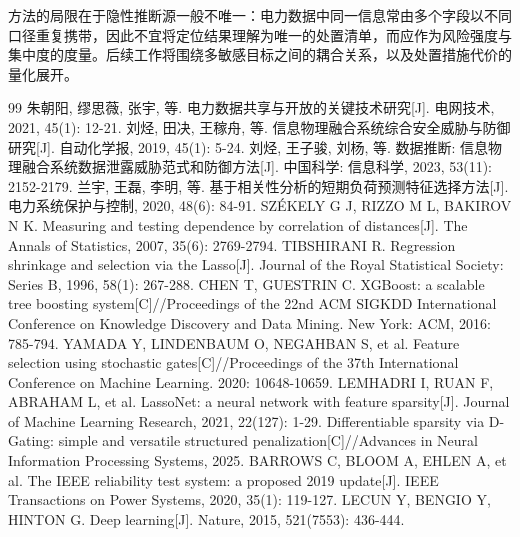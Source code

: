\documentclass[UTF8,zihao=5,twoside]{ctexart}
\begin{document}
方法的局限在于隐性推断源一般不唯一：电力数据中同一信息常由多个字段以不同口径重复携带，因此不宜将定位结果理解为唯一的处置清单，而应作为风险强度与集中度的度量。后续工作将围绕多敏感目标之间的耦合关系，以及处置措施代价的量化展开。

\begin{thebibliography}{99}
朱朝阳, 缪思薇, 张宇, 等. 电力数据共享与开放的关键技术研究[J]. 电网技术, 2021, 45(1): 12-21.
刘烃, 田决, 王稼舟, 等. 信息物理融合系统综合安全威胁与防御研究[J]. 自动化学报, 2019, 45(1): 5-24.
刘烃, 王子骏, 刘杨, 等. 数据推断: 信息物理融合系统数据泄露威胁范式和防御方法[J]. 中国科学: 信息科学, 2023, 53(11): 2152-2179.
兰宇, 王磊, 李明, 等. 基于相关性分析的短期负荷预测特征选择方法[J]. 电力系统保护与控制, 2020, 48(6): 84-91.
SZ\'{E}KELY G J, RIZZO M L, BAKIROV N K. Measuring and testing dependence by correlation of distances[J]. The Annals of Statistics, 2007, 35(6): 2769-2794.
TIBSHIRANI R. Regression shrinkage and selection via the Lasso[J]. Journal of the Royal Statistical Society: Series B, 1996, 58(1): 267-288.
CHEN T, GUESTRIN C. XGBoost: a scalable tree boosting system[C]//Proceedings of the 22nd ACM SIGKDD International Conference on Knowledge Discovery and Data Mining. New York: ACM, 2016: 785-794.
YAMADA Y, LINDENBAUM O, NEGAHBAN S, et al. Feature selection using stochastic gates[C]//Proceedings of the 37th International Conference on Machine Learning. 2020: 10648-10659.
LEMHADRI I, RUAN F, ABRAHAM L, et al. LassoNet: a neural network with feature sparsity[J]. Journal of Machine Learning Research, 2021, 22(127): 1-29.
Differentiable sparsity via D-Gating: simple and versatile structured penalization[C]//Advances in Neural Information Processing Systems, 2025.
BARROWS C, BLOOM A, EHLEN A, et al. The IEEE reliability test system: a proposed 2019 update[J]. IEEE Transactions on Power Systems, 2020, 35(1): 119-127.
LECUN Y, BENGIO Y, HINTON G. Deep learning[J]. Nature, 2015, 521(7553): 436-444.
\end{thebibliography}

\vspace{0.6em}
\end{document}
